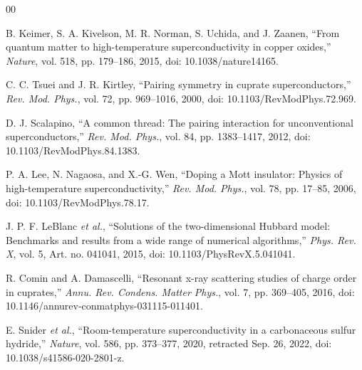 \documentclass[conference]{IEEEtran}
\begin{document}
\begin{thebibliography}{00}

 B. Keimer, S. A. Kivelson, M. R. Norman, S. Uchida, and J. Zaanen, ``From quantum matter to high-temperature superconductivity in copper oxides,'' \emph{Nature}, vol. 518, pp. 179--186, 2015, doi: 10.1038/nature14165.

 C. C. Tsuei and J. R. Kirtley, ``Pairing symmetry in cuprate superconductors,'' \emph{Rev. Mod. Phys.}, vol. 72, pp. 969--1016, 2000, doi: 10.1103/RevModPhys.72.969.

 D. J. Scalapino, ``A common thread: The pairing interaction for unconventional superconductors,'' \emph{Rev. Mod. Phys.}, vol. 84, pp. 1383--1417, 2012, doi: 10.1103/RevModPhys.84.1383.

 P. A. Lee, N. Nagaosa, and X.-G. Wen, ``Doping a Mott insulator: Physics of high-temperature superconductivity,'' \emph{Rev. Mod. Phys.}, vol. 78, pp. 17--85, 2006, doi: 10.1103/RevModPhys.78.17.

 J. P. F. LeBlanc \emph{et al.}, ``Solutions of the two-dimensional Hubbard model: Benchmarks and results from a wide range of numerical algorithms,'' \emph{Phys. Rev. X}, vol. 5, Art. no. 041041, 2015, doi: 10.1103/PhysRevX.5.041041.

 R. Comin and A. Damascelli, ``Resonant x-ray scattering studies of charge order in cuprates,'' \emph{Annu. Rev. Condens. Matter Phys.}, vol. 7, pp. 369--405, 2016, doi: 10.1146/annurev-conmatphys-031115-011401.

 E. Snider \emph{et al.}, ``Room-temperature superconductivity in a carbonaceous sulfur hydride,'' \emph{Nature}, vol. 586, pp. 373--377, 2020, retracted Sep. 26, 2022, doi: 10.1038/s41586-020-2801-z.

\end{thebibliography}
\end{document}
